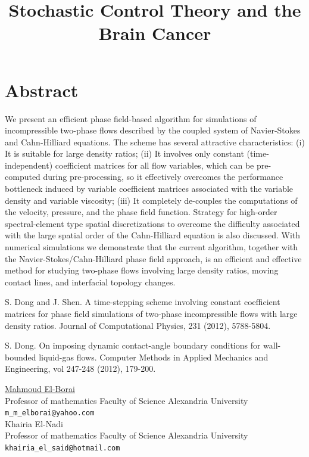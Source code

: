 \documentclass[article, A4, 11pt]{llncs}%
\begin{document}
\section*{Abstract}
We present an efficient phase field-based  algorithm for simulations of incompressible two-phase flows described by the coupled system of  Navier-Stokes and Cahn-Hilliard equations. The scheme has several attractive characteristics: (i) It is suitable for large density ratios; (ii) It involves only constant (time-independent) coefficient matrices for all flow variables, which can be pre-computed during pre-processing, so it effectively overcomes the performance bottleneck induced by variable coefficient matrices associated with the variable density and variable viscosity; (iii) It  completely de-couples the computations of the velocity, pressure, and the phase field function. Strategy for high-order spectral-element type spatial discretizations to overcome the difficulty associated with the large spatial order of the Cahn-Hilliard equation is also discussed. With numerical simulations we demonstrate that the current algorithm, together with the Navier-Stokes/Cahn-Hilliard phase field approach, is an efficient and effective method for studying two-phase flows involving large density ratios, moving contact lines, and interfacial topology changes. 



\begin{thebibliography}{10}
{\sc S. Dong and J. Shen}. {A time-stepping scheme involving constant coefficient matrices for phase field simulations of two-phase incompressible flows with large density ratios}. Journal of Computational Physics, 231 (2012), 5788-5804.

{\sc S. Dong}. {On imposing dynamic contact-angle boundary conditions for wall-bounded liquid-gas flows}. Computer Methods in Applied Mechanics and Engineering, vol 247-248 (2012), 179-200.
\end{thebibliography} %

\title{Stochastic Control Theory and the Brain Cancer}
 \author{} \institute{}
\maketitle
\begin{center}
{\large \underline{Mahmoud El-Borai}}\\
Professor of mathematics Faculty of Science Alexandria University\\
{\tt \tt m\_m\_elborai@yahoo.com}
\\ \vspace{4mm}
{\large Khairia El-Nadi}\\
Professor of mathematics Faculty of Science Alexandria University\\
{\tt \tt khairia\_el\_said@hotmail.com}
\end{center}
\end{document}
